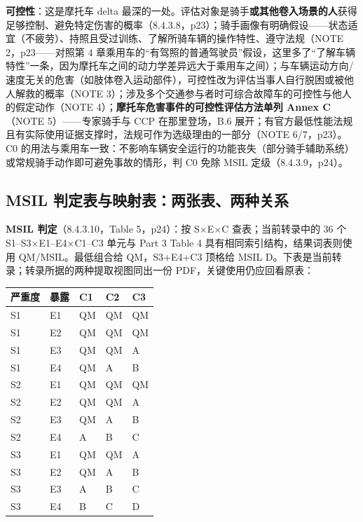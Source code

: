 \textbf{可控性}：这是摩托车 delta 最深的一处。评估对象是骑手\textbf{或其他卷入场景的人}获得足够控制、避免特定伤害的概率（8.4.3.8，p23）；骑手画像有明确假设——状态适宜（不疲劳）、持照且受过训练、了解所骑车辆的操作特性、遵守法规（NOTE 2，p23——对照第 4 章乘用车的“有驾照的普通驾驶员”假设，这里多了“了解车辆特性”一条，因为摩托车之间的动力学差异远大于乘用车之间）；与车辆运动方向/速度无关的危害（如肢体卷入运动部件），可控性改为评估当事人自行脱困或被他人解救的概率（NOTE 3）；涉及多个交通参与者时可综合故障车的可控性与他人的假定动作（NOTE 4）；\textbf{摩托车危害事件的可控性评估方法单列 Annex C}（NOTE 5）——专家骑手与 CCP 在那里登场，B.6 展开；有官方最低性能法规且有实际使用证据支撑时，法规可作为选级理由的一部分（NOTE 6/7，p23）。C0 的用法与乘用车一致：不影响车辆安全运行的功能丧失（部分骑手辅助系统）或常规骑手动作即可避免事故的情形，判 C0 免除 MSIL 定级（8.4.3.9，p24）。

\subsection{MSIL 判定表与映射表：两张表、两种关系}

\textbf{MSIL 判定}（8.4.3.10，Table 5，p24）：按 S\(\times\)E\(\times\)C 查表；当前转录中的 36 个 S1–S3\(\times\)E1–E4\(\times\)C1–C3 单元与 Part 3 Table 4 具有相同索引结构，结果词表则使用 QM/MSIL。最低组合给 QM，S3+E4+C3 顶格给 MSIL D。下表是当前转录；转录所据的两种提取视图同出一份 PDF，关键使用仍应回看原表：

\begingroup\small
\setlength{\tabcolsep}{4pt}
\begin{xltabular}{\linewidth}{@{}XXXXX@{}}
\toprule
严重度 & 暴露 & C1 & C2 & C3 \\
\midrule
\endhead
S1 & E1 & QM & QM & QM \\
S1 & E2 & QM & QM & QM \\
S1 & E3 & QM & QM & A \\
S1 & E4 & QM & A & B \\
S2 & E1 & QM & QM & QM \\
S2 & E2 & QM & QM & A \\
S2 & E3 & QM & A & B \\
S2 & E4 & A & B & C \\
S3 & E1 & QM & QM & A \\
S3 & E2 & QM & A & B \\
S3 & E3 & A & B & C \\
S3 & E4 & B & C & D \\
\bottomrule
\end{xltabular}
\endgroup

